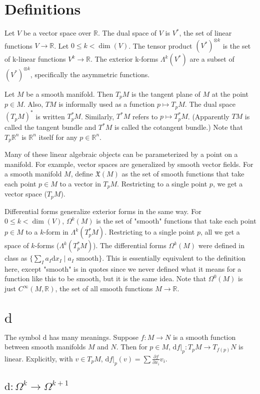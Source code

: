 \documentclass[10pt]{article}
\newcommand{\gap}{\vspace{3mm}}
\newcommand{\bb}[1]{\mathbb{#1}}
\newcommand{\de}{\mathrm{d}}
\newcommand{\frakx}{\mathfrak{X}}
\newcommand{\partials}[2]{\frac{\partial #1}{\partial #2}}
\begin{document}
	\section*{Definitions}

	Let $V$ be a vector space over $\bb{R}$. The dual space of $V$ is $V^*$, the set of linear functions $V \to \bb{R}$. Let $0 \leq k < \dim(V)$. The tensor product $(V^*)^{\otimes k}$ is the set of k-linear functions $V^k \to \bb{R}$. The exterior k-forms $\Lambda^k(V^*)$ are a subset of $(V^*)^{\otimes k}$, specifically the asymmetric functions.

	\gap
	Let $M$ be a smooth manifold. Then $T_p M$ is the tangent plane of $M$ at the point $p \in M$. Also, $TM$ is informally used as a function $p \mapsto T_p M$. The dual space $(T_p M)^*$ is written $T_p^* M$. Similarly, $T^* M$ refers to $p \mapsto T_p^* M$. (Apparently $TM$ is called the tangent bundle and $T^* M$ is called the cotangent bundle.) Note that $T_p \bb{R}^n$ is $\bb{R}^n$ itself for any $p \in \bb{R}^n$.

	\gap
	Many of these linear algebraic objects can be parameterized by a point on a manifold. For example, vector spaces are generalized by smooth vector fields. For a smooth manifold $M$, define $\frakx(M)$ as the set of smooth functions that take each point $p \in M$ to a vector in $T_p M$. Restricting to a single point $p$, we get a vector space ($T_p M$).

	Differential forms generalize exterior forms in the same way. For $0 \leq k < \dim(V)$, $\Omega^k(M)$ is the set of "smooth" functions that take each point $p \in M$ to a $k$-form in $\Lambda^k(T_p^* M)$. Restricting to a single point $p$, all we get a space of $k$-forms ($\Lambda^k(T_p^* M)$). The differential forms $\Omega^k(M)$ were defined in class as $\{\sum_I a_I \de x_I \mid a_I \text{ smooth}\}$. This is essentially equivalent to the definition here, except "smooth" is in quotes since we never defined what it means for a function like this to be smooth, but it is the same idea. Note that $\Omega^0(M)$ is just $C^\infty(M, \bb{R})$, the set of all smooth functions $M \to \bb{R}$.

	\section*{$\de$}
	The symbol $\de$ has many meanings. Suppose $f : M \to N$ is a smooth function between smooth manifolds $M$ and $N$. Then for $p \in M$, $\de f|_p : T_p M \to T_{f(p)} N$ is linear. Explicitly, with $v \in T_p M$, $\de f|_p(v) = \sum \partials{f}{x_i} v_i$. %

	\subsection*{$\de : \Omega^k \to \Omega^{k+1}$}
\end{document}

